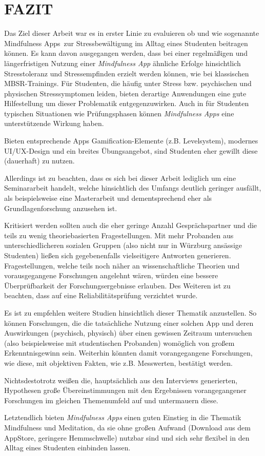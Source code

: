 \documentclass[10pt]{article}
\begin{document}
\section{FAZIT}
Das Ziel dieser Arbeit war  es in erster Linie zu evaluieren ob und wie sogenannte \grqq Mindfulness Apps\grqq\ zur Stressbewältigung im Alltag eines Studenten beitragen können. 
Es kann davon ausgegangen werden, dass bei einer regelmäßigen und längerfristigen Nutzung einer \textit{Mindfulness App} ähnliche Erfolge hinsichtlich Stresstoleranz und Stressempfinden erzielt werden können, wie bei klassischen MBSR-Trainings. 
Für Studenten, die häufig unter Stress bzw. psychischen und physischen Stresssymptomen leiden, bieten derartige Anwendungen eine gute Hilfestellung um dieser Problematik entgegenzuwirken.
Auch in für Studenten typischen Situationen wie Prüfungsphasen können \textit{Mindfulness Apps} eine unterstützende Wirkung haben.

Bieten entsprechende Apps Gamification-Elemente (z.B. Levelsystem), modernes UI/UX-Design und ein breites Übungsangebot, sind Studenten eher gewillt diese (dauerhaft) zu nutzen.

Allerdings ist zu beachten, dass es sich bei dieser Arbeit lediglich um eine Seminararbeit handelt, welche hinsichtlich des Umfangs deutlich geringer ausfällt, als beispielsweise eine Masterarbeit und dementsprechend eher als Grundlagenforschung anzusehen ist. 

Kritisiert werden sollten auch die eher geringe Anzahl Gesprächspartner und die teils zu wenig theoriebasierten  Fragestellungen. Mit mehr Probanden aus unterschiedlicheren sozialen Gruppen (also nicht nur in Würzburg ansässige Studenten) ließen sich gegebenenfalls vielseitigere Antworten generieren. Fragestellungen, welche teils noch näher an wissenschaftliche Theorien und vorausgegangene Forschungen angelehnt wären, würden eine bessere Überprüfbarkeit der Forschungsergebnisse erlauben. Des Weiteren ist zu beachten, dass auf eine Reliabilitätsprüfung verzichtet wurde.

Es ist zu empfehlen weitere Studien hinsichtlich dieser Thematik anzustellen. So können Forschungen, die die tatsächliche Nutzung einer solchen App und deren Auswirkungen (psychisch, physisch) über einen gewissen Zeitraum untersuchen (also beispielsweise mit studentischen Probanden) womöglich von großem Erkenntnisgewinn sein. Weiterhin könnten damit vorangegangene Forschungen, wie diese, mit objektiven Fakten, wie z.B. Messwerten, bestätigt werden.

Nichtsdestotrotz weißen die, hauptsächlich aus den Interviews generierten, Hypothesen große Übereinstimmungen mit den Ergebnissen vorangegangener Forschungen im gleichen Themenumfeld auf und untermauern diese.

Letztendlich bieten \textit{Mindfulness Apps} einen guten Einstieg in die Thematik Mindfulness und Meditation, da sie ohne großen Aufwand (Download aus dem AppStore, geringere Hemmschwelle) nutzbar sind und sich sehr flexibel in den Alltag eines Studenten einbinden lassen. 
\nocite{*}
\printbibliography
\end{document}
